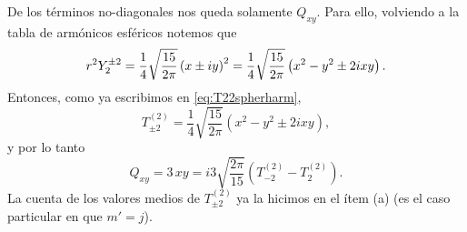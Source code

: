 \documentclass[10pt, a4paper]{article}
\numberwithin{equation}{subsection}
\begin{document}
De los términos no-diagonales nos queda solamente $Q_{xy}$. Para ello,
volviendo a la tabla de armónicos esféricos notemos que
\begin{equation}
  r^2\SphericalHarmonic{2}{\pm2}
  = \frac{1}{4}\sqrt{\frac{15}{2\pi}} \left(x \pm iy\right)^2
  = \frac{1}{4}\sqrt{\frac{15}{2\pi}} \left(x^2 - y^2 \pm2ixy\right).
\end{equation}
Entonces, como ya escribimos en \eqref{eq:T22spherharm},
\begin{equation}
  T^{(2)}_{\pm2} = \frac{1}{4}\sqrt{\frac{15}{2\pi}}\left(x^2 - y^2
    \pm2ixy\right),
\end{equation}
y por lo tanto
\begin{equation}
  Q_{xy} = 3\,xy = i3\sqrt{\frac{2\pi}{15}}
    \left(T^{(2)}_{-2} - T^{(2)}_{2}\right).
\end{equation}
La cuenta de los valores medios de $T^{(2)}_{\pm2}$ ya la hicimos en el ítem
(a) (es el caso particular en que $m' = j$).
\end{document}
